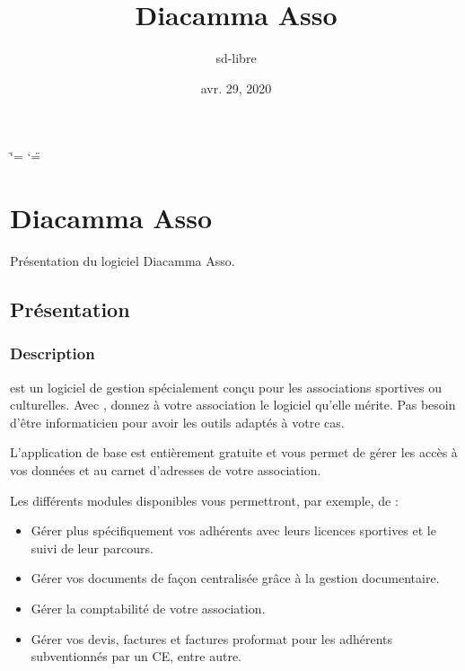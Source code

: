 \documentclass[a4paper,10pt,oneside,french]{sphinxmanual}
\title{Diacamma Asso}
\date{avr. 29, 2020}
\author{sd-libre}
\begin{document}
\ifdefined\shorthandoff
  \ifnum\catcode`\=\string=\active\shorthandoff{=}\fi
  \ifnum\catcode`\"=\active{}\fi
\fi

\pagestyle{empty}
\sphinxmaketitle
\pagestyle{plain}
\sphinxtableofcontents
\pagestyle{normal}
\label{\detokenize{index::doc}}



\chapter{Diacamma Asso}
\label{\detokenize{asso/index:diacamma-asso}}\label{\detokenize{asso/index::doc}}
Présentation du logiciel Diacamma Asso.


\section{Présentation}
\label{\detokenize{asso/presentation:presentation}}\label{\detokenize{asso/presentation::doc}}

\subsection{Description}
\label{\detokenize{asso/presentation:description}}
 est un logiciel de gestion spécialement conçu pour les associations sportives ou culturelles.
Avec , donnez à votre association le logiciel qu’elle mérite. Pas besoin d’être informaticien pour avoir les outils adaptés à votre cas.

L’application de base est entièrement gratuite et vous permet de gérer les accès à vos données et au carnet d’adresses de votre association.

Les différents modules disponibles vous permettront, par exemple, de :
\begin{itemize}
\item {} 
Gérer plus spécifiquement vos adhérents avec leurs licences sportives et le suivi de leur parcours.

\item {} 
Gérer vos documents de façon centralisée grâce à la gestion documentaire.

\item {} 
Gérer la comptabilité de votre association.

\item {} 
Gérer vos devis, factures et factures proformat pour les adhérents subventionnés par un CE, entre autre.

\end{itemize}
\end{document}
